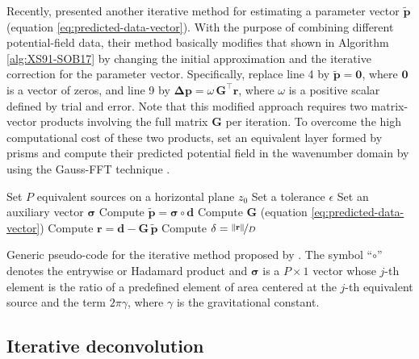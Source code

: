 Recently, \citet{jirigalatu-ebbing2019} presented another iterative method for estimating a parameter 
vector $\tilde{\mathbf{p}}$ (equation \ref{eq:predicted-data-vector}). 
With the purpose of combining different potential-field data, 
their method basically modifies that shown in Algorithm \ref{alg:XS91-SOB17} by changing the initial approximation 
and the iterative correction for the parameter vector.
Specifically, \citet{jirigalatu-ebbing2019} replace line 4 by $\tilde{\mathbf{p}} = \mathbf{0}$, where $\mathbf{0}$ is a vector of zeros,
and line 9 by $\boldsymbol{\Delta}\mathbf{p} = \omega \, \mathbf{G}^{\top} \mathbf{r}$, where $\omega$ is a positive
scalar defined by trial and error.
Note that this modified approach requires two matrix-vector products involving the full matrix $\mathbf{G}$ per iteration.
To overcome the high computational cost of these two products, \citet{jirigalatu-ebbing2019} set an equivalent layer formed by
prisms and compute their predicted potential field in the wavenumber domain by using the Gauss-FFT technique
\cite{zhao-etal2018}.

\begin{algorithm}
	\Input{}
	Set $P$ equivalent sources on a horizontal plane $z_{0}$ \;
	Set a tolerance $\epsilon$ \;
	Set an auxiliary vector $\boldsymbol{\sigma}$ \;
	Compute $\tilde{\mathbf{p}} = \boldsymbol{\sigma} \circ \mathbf{d}$ \;
	Compute $\mathbf{G}$ (equation \ref{eq:predicted-data-vector}) \;
	Compute $\mathbf{r} = \mathbf{d} - \mathbf{G} \, \tilde{\mathbf{p}}$ \;
	Compute $\delta = \nicefrac{\| \mathbf{r} \|}{D}$ \;
	\caption{Generic pseudo-code for the iterative method proposed by \cite{siqueira-etal2017}.
	The symbol ``$\circ$'' denotes the entrywise or Hadamard product \cite[e.g.,][p. 298]{horn-johnson1991} and
	$\boldsymbol{\sigma}$ is a $P \times 1$ vector whose $j$-th element is the ratio of a predefined element of area centered at the $j$-th
	equivalent source and the term $2 \pi \gamma$, where $\gamma$ is the gravitational constant.}
	\label{alg:XS91-SOB17}
\end{algorithm}

\subsection{Iterative deconvolution}

